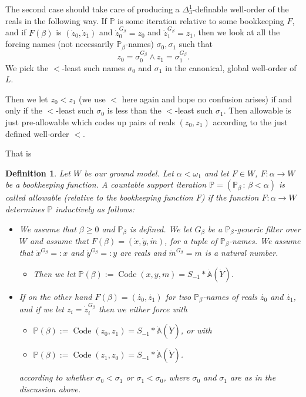 \documentclass[a4paper,11pt]{article}
\newtheorem{definition}[theorem]{Definition}
\newcommand{\forceP}{\mathbb{P}}
\begin{document}
 The second case should take care of producing a $\Delta^1_3$-definable well-order of the reals in the following way. If $\forceP$ is some iteration relative to some bookkeeping $F$, and if $F(\beta)$ is $(\dot{z}_0,\dot{z}_1)$ and 
$\dot{z}_0^{G_{\beta}}=z_0$ and $\dot{z}_1^{G_{\beta}}=z_1$, then we look at all the forcing names (not necessarily $\forceP_{\beta}$-names) $\sigma_0,\sigma_1$ such that 
\[z_0 =\sigma_0^{G_{\beta}} \land z_1 = \sigma_1^{G_{\beta}}.\]
We pick the $<$-least such names $\sigma_0$ and $\sigma_1$ in the canonical, global well-order of $L$.

Then we let $z_0 < z_1$ (we use $<$ here again and hope no confusion arises) if and only if the $<$-least such $\sigma_0$ is less than the $<$-least such $\sigma_1$.
Then allowable is just pre-allowable which codes up pairs of reals $(z_0,z_1)$ according to the just defined well-order $<$.

That is 

\begin{definition}
Let $W$ be our ground model. Let $\alpha < \omega_1$ and let $F\in W$, $F: \alpha \rightarrow W$ be a bookkeeping function.
A countable support iteration $\forceP=(\forceP_{\beta}\,:\, {\beta< \alpha})$ is called allowable (relative to the bookkeeping function $F$)  if the function $F: \alpha \rightarrow W$  determines $\forceP$ inductively as follows:
 \begin{itemize}
 \item We assume that $\beta \ge 0$ and $\forceP_{\beta}$ is defined.
 We let $G_{\beta}$ be a $\forceP_{\beta}$-generic filter over $W$ and assume that $F(\beta)=(\dot{x},\dot{y},\dot{m})$, for a tuple of $\forceP_{\beta}$-names. We assume that $\dot{x}^{G_{\beta}}=:x$ and $\dot{y}^{G_{\beta}}=:y $ are reals and $\dot{m}^{G_{\beta}}=m$ is a natural number.
 
 \begin{itemize}
 \item[]Then we let $\forceP(\beta):= \operatorname{Code} (x,y,m)= S_{-1} \ast \dot{\mathbb{A}} (\dot{Y} )$.
 \end{itemize}
 \item If on the other hand $F(\beta)= (\dot{z_0},\dot{z_1})$ for two $\forceP_{\beta}$-names of reals $\dot{z_0}$ and $\dot{z_1}$, and if we let $z_i = \dot{z}_i^{G_{\beta}}$ then we either force with 
 \begin{itemize}
 \item[] $\forceP(\beta):= \operatorname{Code} (z_0,z_1)= S_{-1} \ast \dot{\mathbb{A}} (\dot{Y} )$, or with 
 \item[] $\forceP(\beta):= \operatorname{Code} (z_1,z_0)= S_{-1} \ast \dot{\mathbb{A}} (\dot{Y} )$.
 \end{itemize}
 according to whether $\sigma_0 < \sigma_1$ or $\sigma_1 < \sigma_0$, where $\sigma_0$ and $\sigma_1$ are as in the discussion above.

 \end{itemize}
 
\end{definition}
\end{document}
